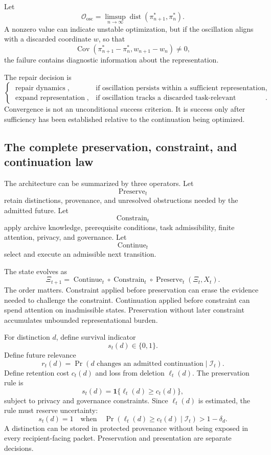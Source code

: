 \documentclass[11pt]{article}
\theoremstyle{definition}
\DeclareMathOperator{\Cov}{Cov}
\DeclareMathOperator{\Prob}{Pr}
\DeclareMathOperator{\dist}{dist}
\newcommand{\ind}{\mathbf{1}}
\begin{document}
Let
\[
\mathcal{O}_{\mathrm{osc}}
=
\limsup_{n\to\infty}
\dist(\pi_{n+1}^{*},\pi_n^{*}).
\]
A nonzero value can indicate unstable optimization, but if the oscillation aligns with a discarded coordinate \(w\), so that
\[
\Cov(
\pi_{n+1}^{*}-\pi_n^{*},
w_{n+1}-w_n
)\neq0,
\]
the failure contains diagnostic information about the representation.

The repair decision is
\[
\begin{cases}
\operatorname{repair\ dynamics},&
\text{if oscillation persists within a sufficient representation},
\\
\operatorname{expand\ representation},&
\text{if oscillation tracks a discarded task-relevant distinction}.
\end{cases}
\]
Convergence is not an unconditional success criterion. It is success only after sufficiency has been established relative to the continuation being optimized.

\subsection{The complete preservation, constraint, and continuation law}

The architecture can be summarized by three operators. Let
\[
\operatorname{Preserve}_t
\]
retain distinctions, provenance, and unresolved obstructions needed by the admitted future. Let
\[
\operatorname{Constrain}_t
\]
apply archive knowledge, prerequisite conditions, task admissibility, finite attention, privacy, and governance. Let
\[
\operatorname{Continue}_t
\]
select and execute an admissible next transition.

The state evolves as
\[
\Xi_{t+1}
=
\operatorname{Continue}_t
\circ
\operatorname{Constrain}_t
\circ
\operatorname{Preserve}_t
(\Xi_t,X_t).
\]
The order matters. Constraint applied before preservation can erase the evidence needed to challenge the constraint. Continuation applied before constraint can spend attention on inadmissible states. Preservation without later constraint accumulates unbounded representational burden.

For distinction \(d\), define survival indicator
\[
s_t(d)\in\{0,1\}.
\]
Define future relevance
\[
r_t(d)
=
\Prob(
d\text{ changes an admitted continuation}
\mid
\mathscr{I}_t
).
\]
Define retention cost \(c_t(d)\) and loss from deletion \(\ell_t(d)\). The preservation rule is
\[
s_t(d)
=
\ind\{
\ell_t(d)\geq c_t(d)
\},
\]
subject to privacy and governance constraints. Since \(\ell_t(d)\) is estimated, the rule must reserve uncertainty:
\[
s_t(d)
=
1
\quad
\text{when}
\quad
\Prob(
\ell_t(d)\geq c_t(d)
\mid
\mathscr{I}_t
)
>
1-\delta_d.
\]
A distinction can be stored in protected provenance without being exposed in every recipient-facing packet. Preservation and presentation are separate decisions.
\end{document}
